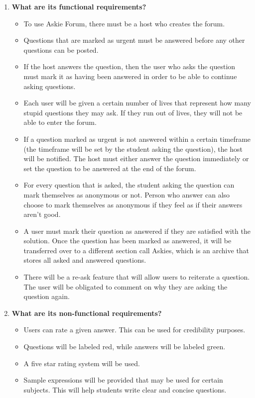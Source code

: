 \documentclass[12pt]{article}
\begin{document}
\begin{enumerate}
    \item \textbf{What are its functional requirements?}
\begin{itemize}
\item To use Askie Forum, there must be a host who creates the forum.
\item Questions that are marked as urgent must be answered before any other questions can be posted.
\item If the host answers the question, then the user who asks the question must mark it as having been answered in order to be able to continue asking questions.
\item Each user will be given a certain number of lives that represent how many stupid questions they may ask. If they run out of lives, they will not be able to enter the forum.
\item If a question marked as urgent is not answered within a certain timeframe (the timeframe will be set by the student asking the question), the host will be notified. The host must either answer the question immediately or set the question to be answered at the end of the forum.
\item For every question that is asked, the student asking the question can mark themselves as anonymous or not. Person who answer can also choose to mark themselves as anonymous if they feel as if their answers aren't good. 
\item A user must mark their question as answered if they are satisfied with the solution. Once the question has been marked as answered, it will be transferred over to a different section call Askies, which is an archive that stores all asked and answered questions.
\item There will be a re-ask feature that will allow users to reiterate a question. The user will be obligated to comment on why they are asking the question again.
\end{itemize}

    \item \textbf{What are its non-functional requirements?}
\begin{itemize}
\item Users can rate a given answer. This can be used for credibility purposes.
\item Questions will be labeled red, while answers will be labeled green.
\item A five star rating system will be used.
\item Sample expressions will be provided that may be used for certain subjects. This will help students write clear and concise questions.
\end{itemize}


\end{enumerate}
\end{document}
